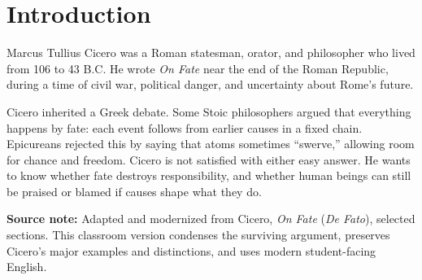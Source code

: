 \documentclass[12pt]{article}
\newcommand{\focusbox}[1]{%
\vspace{0.4em}\noindent\colorbox{gray!12}{\begin{minipage}{0.96\linewidth}#1\end{minipage}}\vspace{0.5em}}
\begin{document}
\section*{Introduction}
Marcus Tullius Cicero was a Roman statesman, orator, and philosopher who lived from 106 to 43 B.C. He wrote \textit{On Fate} near the end of the Roman Republic, during a time of civil war, political danger, and uncertainty about Rome's future.

Cicero inherited a Greek debate. Some Stoic philosophers argued that everything happens by fate: each event follows from earlier causes in a fixed chain. Epicureans rejected this by saying that atoms sometimes ``swerve,'' allowing room for chance and freedom. Cicero is not satisfied with either easy answer. He wants to know whether fate destroys responsibility, and whether human beings can still be praised or blamed if causes shape what they do.

\focusbox{\textbf{Source note:} Adapted and modernized from Cicero, \textit{On Fate} (\textit{De Fato}), selected sections. This classroom version condenses the surviving argument, preserves Cicero's major examples and distinctions, and uses modern student-facing English.}
\end{document}
